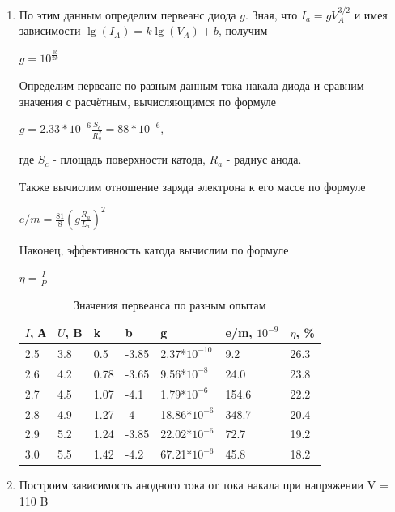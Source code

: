 \documentclass[a4paper]{article}
\begin{document}
\begin{enumerate}
\item По этим данным определим первеанс диода $g$. Зная, что $I_a = gV_A^{3/2}$ и имея зависимости $\lg(I_A) = k \lg(V_A) + b$, получим
\begin{center}
    $g = 10^{\frac{3b}{2k}}$
\end{center}

Определим первеанс по разным данным тока накала диода и сравним значения с расчётным, вычисляющимся по формуле

\begin{center}
    $g = 2.33*10^{-6} \frac{S_c}{R_a ^2} = 88*10^{-6}$,
\end{center}
где $S_c$ - площадь поверхности катода, $R_a$ - радиус анода. \par

Также вычислим отношение заряда электрона к его массе по формуле

\begin{center}
   $e/m = \frac{81}{8}(g\frac{R_a}{L_a})^2$
\end{center}

Наконец, эффективность катода вычислим по формуле
\begin{center}
    $\eta = \frac{I}{P}$
\end{center}

    \begin{table}[h]
    \centering
    \begin{center}
    \caption{Значения первеанса по разным опытам}
    \end{center}
    \vspace{0.1cm}
    \label{tab:my_label}
    \begin{tabular}{ |p{1cm}|p{1cm}|p{1cm}|p{1cm}|p{2cm}|p{2cm}|p{2cm}|}
 \hline
 $I$, А & $U$, B & k & b & g & e/m, $10^{-9}$ & $\eta$, \% \\
 \hline
 \hline
2.5 & 3.8 & 0.5 & -3.85 & 2.37*$10^{-10}$ & 9.2 & 26.3\\
 \hline
2.6 & 4.2 & 0.78 & -3.65 & 9.56*$10^{-8}$ & 24.0 & 23.8\\
 \hline
2.7 & 4.5 & 1.07 & -4.1 & 1.79*$10^{-6}$ & 154.6 & 22.2\\
 \hline
2.8 & 4.9 & 1.27 & -4 & 18.86*$10^{-6}$ & 348.7 & 20.4 \\
 \hline
2.9 & 5.2 & 1.24 & -3.85 & 22.02*$10^{-6}$ & 72.7 & 19.2\\
 \hline
3.0 & 5.5 & 1.42 & -4.2 & 67.21*$10^{-6}$ & 45.8 & 18.2\\
 \hline 

\end{tabular}
\end{table}

\item Построим зависимость анодного тока от тока накала при напряжении V = 110 B

\end{enumerate}
\end{document}
